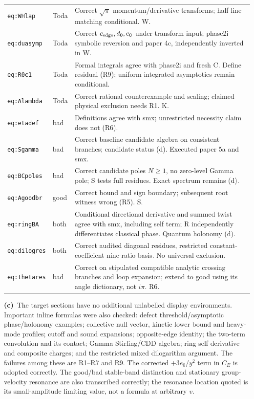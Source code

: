 \documentclass[11pt,a4paper]{article}
\newcommand{\C}{\textbf{(c)}\ }
\newcommand{\file}[1]{\nolinkurl{#1}}
\begin{document}
\begin{longtable}{@{}L{3.0cm}L{1.6cm}L{10.6cm}@{}}
\file{eq:WHlap} & Toda & Correct $\sqrt\pi$ momentum/derivative transforms; half-line matching conditional. W.\\
\file{eq:duasymp} & Toda & Correct $c_{\rm edge},d_0,e_0$ under transform input; phase2i symbolic reversion and paper 4c, independently inverted in W.\\
\file{eq:R0c1} & Toda & Formal integrals agree with phase2i and fresh C. Define residual (R9); uniform integrated asymptotics remain conditional.\\
\file{eq:Alambda} & Toda & Correct rational counterexample and scaling; claimed physical exclusion needs R1. K.\\
\file{eq:etadef} & bad & Definitions agree with smx; unrestricted necessity claim does not (R6).\\
\file{eq:Sgamma} & bad & Correct baseline candidate algebra on consistent branches; candidate status (d). Executed paper 5a and smx.\\
\file{eq:BCpoles} & bad & Correct candidate poles $N\ge1$, no zero-level Gamma pole; S tests full residues. Exact spectrum remains (d).\\
\file{eq:Agoodbr} & good & Correct bound and sign boundary; subsequent root witness wrong (R5). S.\\
\file{eq:ringBA} & both & Conditional directional derivative and summed twist agree with smx, including self term; R independently differentiates classical phase. Quantum holonomy (d).\\
\file{eq:dilogres} & both & Correct audited diagonal residues, restricted constant-coefficient nine-ratio basis. No universal exclusion.\\
\file{eq:thetares} & bad & Correct on stipulated compatible analytic crossing branches and loop expansion; extend to good using its angle dictionary, not $i\pi$. R6.\\
\bottomrule
\end{longtable}
\normalsize

\C The target sections have no additional unlabelled display environments.
Important inline formulas were also checked: defect threshold/asymptotic
phase/holonomy examples; collective null vector, kinetic lower bound and
heavy-mode profiles; cutoff and sound expansions; opposite-edge identity;
the two-term convolution and its contact; Gamma Stirling/CDD algebra;
ring self derivative and composite charges; and the restricted mixed
dilogarithm argument. The failures among these are R1--R7 and R9.
The corrected $+3e_0/y^2$ term in $C_E$ is adopted correctly.
The good/bad stable-band distinction and stationary group-velocity resonance
are also transcribed correctly; the resonance location quoted is its
small-amplitude limiting value, not a formula at arbitrary $v$.
\end{document}
